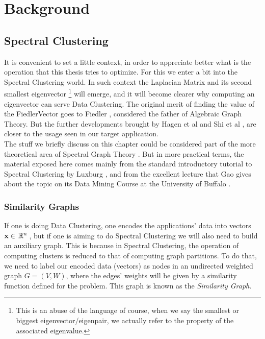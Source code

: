 \chapter{Background}
\label{cha:backg}

\section{Spectral Clustering}

It is convenient to set a little context, in order to appreciate
better what is the operation that this thesis tries to optimize. For
this we enter a bit into the Spectral Clustering world. In such
context the \gls{Laplacian} Matrix and its second smallest eigenvector
\footnote{This is an abuse of the language of course, when
we say the smallest or biggest eigenvector/eigenpair, we actually refer to
the property of the associated eigenvalue.}
will emerge, and it will become clearer why computing
an eigenvector can serve Data Clustering. The original merit of
finding the value of the \gls{FiedlerVector} goes to Fiedler
\cite{fiedler73}, considered the father of Algebraic Graph Theory. But
the further developments brought by Hagen et al \cite{hagen92} and
Shi et al \cite{shi00}, are closer to the usage seen in our target
application. \\

The stuff we briefly discuss on this chapter could be considered part
of the more theoretical area of Spectral Graph Theory
\cite{brouwer12}. But in more
practical terms, the material exposed here comes mainly from the
standard introductory tutorial to Spectral Clustering by Luxburg \cite{luxburg07},
and from the excellent lecture that Gao gives about the topic on
its Data Mining Course at the University of Buffalo \cite{gao13}.

\subsection{Similarity Graphs}\label{sub:sim-graphs}

If one is doing Data Clustering, one encodes the applications' data
into vectors $\mathbf{x} \in \,\mathbb{R}^{n}\,$, but if one is aiming to do Spectral
Clustering we will also need to build an auxiliary graph. This is
because in Spectral Clustering, the operation of computing clusters is
reduced to that of computing graph partitions. To do that, we need to
label our encoded data (vectors) as nodes in an undirected weighted graph $G =
(V,W)$, where the edges' weights will be given by 
a similarity function defined for the problem. This graph is
known as the \emph{Similarity Graph}. \\

